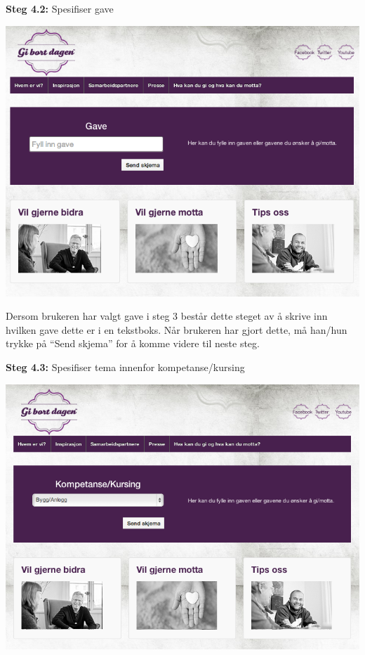 {\bf Steg 4.2:} Spesifiser gave
\begin{center}
\includegraphics[clip=true, width=1 \textwidth,
trim=0cm 0cm 0cm 0cm]{gave.png}
\label{fig:gave}
\end{center}
Dersom brukeren har valgt gave i steg 3 består dette steget av å skrive inn hvilken gave dette er i en tekstboks. Når brukeren har gjort dette, må han/hun trykke på ``Send skjema'' for å komme videre til neste steg.\\

\newpage

{\bf Steg 4.3:} Spesifiser tema innenfor kompetanse/kursing
\begin{center}
\includegraphics[clip=true, width=1 \textwidth,
trim=0cm 0cm 0cm 0cm]{kompetanse.png}
\label{fig:kompetanse}
\end{center}

